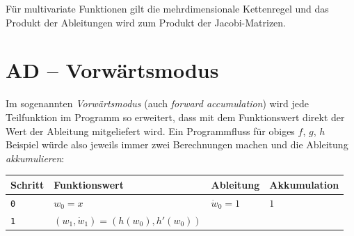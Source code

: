 \documentclass[
]{book}
\theoremstyle{definition}
\theoremstyle{definition}
\theoremstyle{definition}
\theoremstyle{definition}
\theoremstyle{remark}
\begin{document}
Für multivariate Funktionen gilt die mehrdimensionale Kettenregel und das
Produkt der Ableitungen wird zum Produkt der Jacobi-Matrizen.

\hypertarget{ad-vorwuxe4rtsmodus}{%
\section{AD -- Vorwärtsmodus}\label{ad-vorwuxe4rtsmodus}}

Im sogenannten \emph{Vorwärtsmodus} (auch \emph{forward accumulation}) wird jede Teilfunktion im Programm
so erweitert, dass mit dem Funktionswert direkt der Wert der Ableitung
mitgeliefert wird. Ein Programmfluss für obiges \(f\), \(g\), \(h\) Beispiel
würde also jeweils immer zwei Berechnungen machen und die Ableitung
\emph{akkumulieren}:

\begin{longtable}[]{@{}llll@{}}
\toprule
\begin{minipage}[b]{0.17\columnwidth}\raggedright
Schritt\strut
\end{minipage} & \begin{minipage}[b]{0.33\columnwidth}\raggedright
Funktionswert\strut
\end{minipage} & \begin{minipage}[b]{0.17\columnwidth}\raggedright
Ableitung\strut
\end{minipage} & \begin{minipage}[b]{0.22\columnwidth}\raggedright
Akkumulation\strut
\end{minipage}\tabularnewline
\midrule
\endhead
\begin{minipage}[t]{0.17\columnwidth}\raggedright
\texttt{0}\strut
\end{minipage} & \begin{minipage}[t]{0.33\columnwidth}\raggedright
\(w_0 = x\)\strut
\end{minipage} & \begin{minipage}[t]{0.17\columnwidth}\raggedright
\(\dot w_0 = 1\)\strut
\end{minipage} & \begin{minipage}[t]{0.22\columnwidth}\raggedright
\(1\)\strut
\end{minipage}\tabularnewline
\begin{minipage}[t]{0.17\columnwidth}\raggedright
\texttt{1}\strut
\end{minipage} & \begin{minipage}[t]{0.33\columnwidth}\raggedright
\((w_1, \dot w_1) = (h(w_0), h'(w_0))\)\strut
\end{minipage} & \begin{minipage}[t]{0.17\columnwidth}\raggedright

\end{minipage}
\end{longtable}
\end{document}

